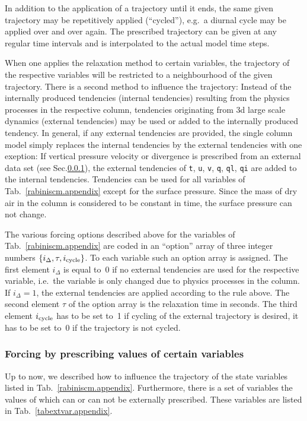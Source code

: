 \begin{appendix}
In addition to the application of a trajectory until it ends,
the same given trajectory may be repetitively applied (``cycled''),
e.g.~a diurnal cycle may be applied over and over again. The
prescribed trajectory can be given at any regular time intervals and
is interpolated to the actual model time steps. 

When one applies the relaxation method to certain variables, the trajectory of
the respective variables will be 
restricted to a neighbourhood of the given trajectory. There is a second
method to influence the trajectory: Instead of the internally
produced tendencies (internal tendencies) resulting from the physics
processes in the respective 
column, tendencies originating from 3d large scale dynamics (external
tendencies) may be
used or added to the internally produced tendency. In general, if any
external tendencies are provided, the single column
model simply replaces the internal tendencies by the external
tendencies with one exeption: If vertical pressure velocity or divergence is
prescribed from an external data set (see Sec.\ref{secvarfor.appendix}), the external
tendencies of {\tt t}, {\tt u}, {\tt v}, {\tt q}, {\tt ql}, {\tt qi}
are added to the internal tendencies.
Tendencies can be
used for all variables of Tab.~\ref{rabiniscm.appendix} except for the surface
pressure. Since the mass of dry air in the column is considered to be
constant in time, the surface pressure can not change.

The various forcing options described above for the variables of
Tab.~\ref{rabiniscm.appendix} are coded in an ``option'' array of three integer numbers
$\{i_\Delta,\tau,i_{\rm cycle}\}$. To each variable such an option
array is assigned. The first element $i_\Delta$ is
equal to~0 if no external tendencies are used for the respective
variable, i.e.~the variable is only changed due to physics processes in the
column. If $i_\Delta=1$, the external tendencies are applied according
to the rule above. The second element $\tau$ of the option array is
the relaxation time in seconds. The third element $i_{\rm cycle}$ has
to be set to~1 if cycling of the external trajectory is desired, it
has to be set to~0 if the trajectory is not cycled.

\subsubsection{Forcing by prescribing values of certain
  variables}\label{secvarfor.appendix}
Up to now, we described how to influence the trajectory of the state
variables listed in Tab.~\ref{rabiniscm.appendix}.
Furthermore, there is a set of variables the values of which can or can not be
externally prescribed. These variables are listed in
Tab.~\ref{tabextvar.appendix}.


\end{appendix}
